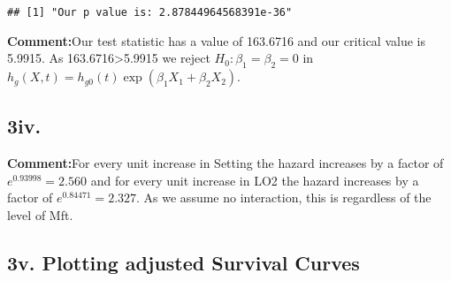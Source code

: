 \documentclass[
]{article}
\begin{document}
\begin{verbatim}
## [1] "Our p value is: 2.87844964568391e-36"
\end{verbatim}

\textbf{Comment:}Our test statistic has a value of 163.6716 and our
critical value is 5.9915. As 163.6716\textgreater5.9915 we reject
\(H_0: \beta_1=\beta_2=0\) in
\(h_g(X,t)=h_{g0}(t)\exp(\beta_1 X_1+ \beta_2 X_2)\).

\hypertarget{iv.}{%
\subsection{3iv.}\label{iv.}}

\textbf{Comment:}For every unit increase in Setting the hazard increases
by a factor of \(e^{0.93998}=2.560\) and for every unit increase in LO2
the hazard increases by a factor of \(e^{0.84471}=2.327\). As we assume
no interaction, this is regardless of the level of Mft.

\hypertarget{v.-plotting-adjusted-survival-curves}{%
\subsection{3v. Plotting adjusted Survival
Curves}\label{v.-plotting-adjusted-survival-curves}}
\end{document}
